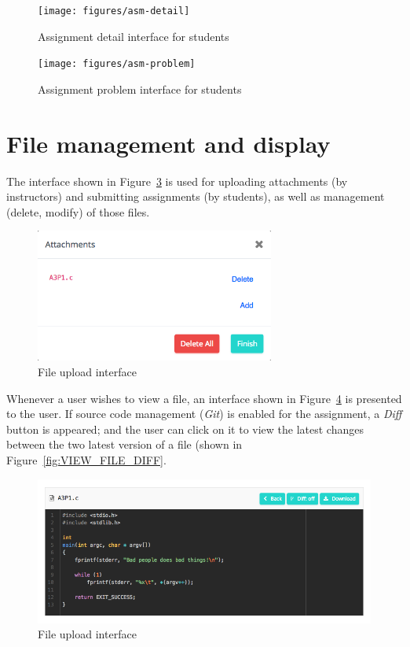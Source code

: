 \begin{figure}[H]
    \centering
        \texttt{[image: figures/asm-detail]}
    \caption{Assignment detail interface for students}
    \label{fig:ASM_DETAIL}
\end{figure}

\begin{figure}[H]
    \centering
        \texttt{[image: figures/asm-problem]}
    \caption{Assignment problem interface for students}
    \label{fig:ASM_PROBLEM}
\end{figure}


\section{File management and display}

The interface shown in Figure~\ref{fig:FILE_UPLOAD} is used for uploading
attachments (by instructors) and submitting assignments (by students), as well
as management (delete, modify) of those files.

\begin{figure}[H]
    \centering
        \includegraphics[width=0.7\textwidth]{figures/file-upload}
    \caption{File upload interface}
    \label{fig:FILE_UPLOAD}
\end{figure}

Whenever a user wishes to view a file, an interface shown in
Figure~\ref{fig:VIEW_FILE} is presented to the user. If source code management
(\emph{Git}) is enabled for the assignment, a \emph{Diff} button is appeared;
and the user can click on it to view the latest changes between the two latest
version of a file (shown in Figure~\ref{fig:VIEW_FILE_DIFF}.

\begin{figure}[H]
    \centering
        \includegraphics[width=1.0\textwidth]{figures/view-file}
    \caption{File upload interface}
    \label{fig:VIEW_FILE}
\end{figure}

